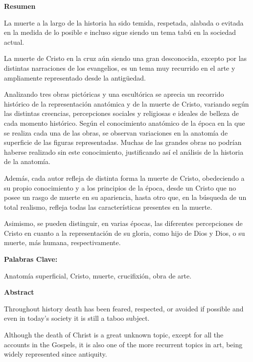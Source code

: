 \textbf{Resumen}

La muerte a la largo de la historia ha sido temida, respetada, alabada o evitada en la medida de lo posible e incluso sigue siendo un tema tabú en la sociedad actual.

La muerte de Cristo en la cruz aún siendo una gran desconocida, excepto por las distintas narraciones de los evangelios, es un tema muy recurrido en el arte y ampliamente representado desde la antigüedad.

Analizando tres obras pictóricas y una escultórica se aprecia un recorrido histórico de la representación anatómica y de la muerte de Cristo, variando según las distintas creencias, percepciones sociales y religiosas e ideales de belleza de cada momento histórico. %
Según el conocimiento anatómico de la época en la que se realiza cada una de las obras, se observan variaciones en la anatomía de superficie de las figuras representadas. Muchas de las grandes obras no podrían haberse realizado sin este conocimiento, justificando así el análisis de la historia de la anatomía.

Además, cada autor refleja de distinta forma la muerte de Cristo, obedeciendo a su propio conocimiento y a los principios de la época, desde un Cristo que no posee un rasgo de muerte en su apariencia, hasta otro que, en la búsqueda de un total realismo, refleja todas las características presentes en la muerte.

Asimismo, se pueden distinguir, en varias épocas, las diferentes percepciones de Cristo en cuanto a la representación de su gloria, como hijo de Dios y Dios, o su muerte, más humana, respectivamente.


\textbf{Palabras Clave:}

Anatomía superficial, Cristo, muerte, crucifixión, obra de arte.

\vspace{10pt}

\textbf{Abstract}

Throughout history death has been feared, respected, or avoided if possible and even in today's society it is still a taboo subject.

Although the death of Christ is a great unknown topic, except for all the accounts in the Gospels, it is also one of the more recurrent topics in art, being widely represented since antiquity.

